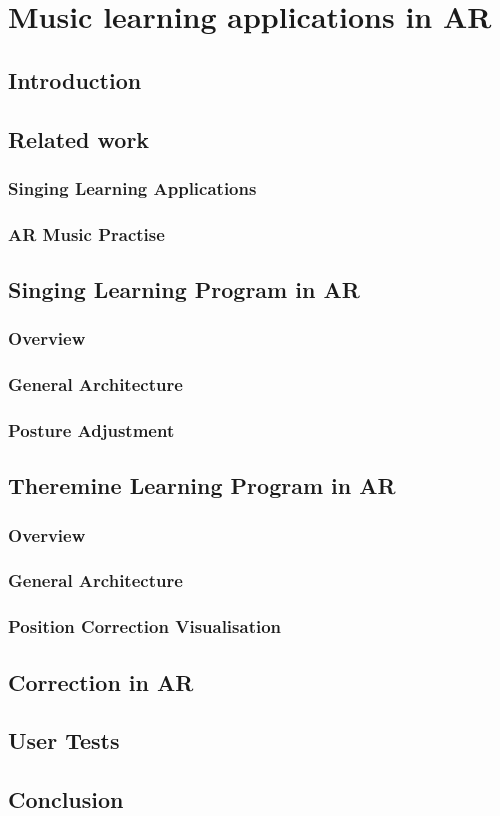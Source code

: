 \chapter{Music learning applications in AR}

\section{Introduction}

\section{Related work}

\subsection{Singing Learning Applications}
\subsection{AR Music Practise}

\section{Singing Learning Program in AR}

\subsection{Overview}
\subsection{General Architecture}
\subsection{Posture Adjustment}

\section{Theremine Learning Program in AR}

\subsection{Overview}
\subsection{General Architecture}
\subsection{Position Correction Visualisation}

\section{Correction in AR}
\section{User Tests}
\section{Conclusion}
